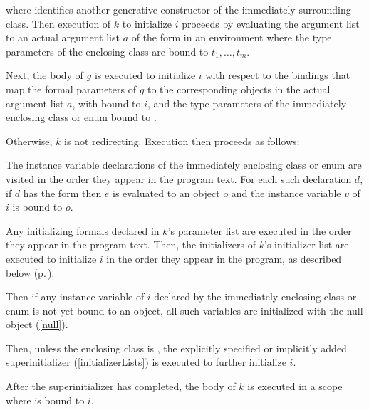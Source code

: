 \documentclass[makeidx]{article}
\begin{document}
where  identifies another generative constructor
of the immediately surrounding class.
Then execution of $k$ to initialize $i$ proceeds by
evaluating the argument list
to an actual argument list $a$ of the form
in an environment where the
type parameters of the enclosing class are bound to
$t_1, \ldots, t_m$.

\LMHash{}%
Next, the body of $g$ is executed to initialize $i$
with respect to the bindings that map
the formal parameters of $g$ to the corresponding objects
in the actual argument list $a$,
with \THIS{} bound to $i$,
and the type parameters of the immediately enclosing class or enum bound to
.

\LMHash{}%
Otherwise, $k$ is not redirecting.
Execution then proceeds as follows:

\LMHash{}%
The instance variable declarations of the immediately enclosing class or enum
are visited in the order they appear in the program text.
For each such declaration $d$, if $d$ has the form
then $e$ is evaluated to an object $o$
and the instance variable $v$ of $i$ is bound to $o$.

\LMHash{}%
Any initializing formals declared in $k$'s parameter list
are executed in the order they appear in the program text.
Then, the initializers of $k$'s initializer list are executed to initialize $i$
in the order they appear in the program, as described below
(p.\,\pageref{executionOfInitializerLists}).


\LMHash{}%
Then if any instance variable of $i$ declared
by the immediately enclosing class or enum
is not yet bound to an object,
all such variables are initialized with the null object (\ref{null}).

\LMHash{}%
Then, unless the enclosing class is , the explicitly specified or
implicitly added superinitializer (\ref{initializerLists}) is executed to
further initialize $i$.

\LMHash{}%
After the superinitializer has completed, the body of $k$ is executed
in a scope where \THIS{} is bound to $i$.
\end{document}
